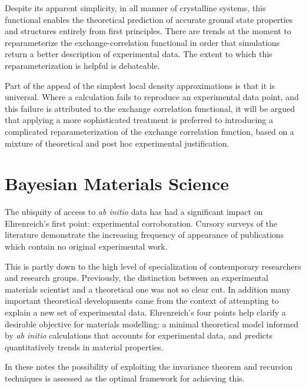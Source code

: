 Despite its apparent simplicity, in all manner of crystalline systems, 
this functional enables the theoretical
prediction of accurate ground state properties and structures entirely from first principles. 
There are trends at the moment to reparameterize the exchange-correlation functional
in order that simulations return a better description of experimental data. The extent
to which this reparameterization is helpful is debateable. 

Part of the appeal of the simplest local density approximations is that it is universal. 
Where a calculation fails to reproduce an experimental data point, and this failure is attributed to the
exchange correlation functional, it will be argued that applying a more sophisticated treatment
is preferred to introducing a complicated reparameterization of the exchange correlation
function, based on a mixture of theoretical and post hoc experimental justification.

\section{Bayesian Materials Science}
The ubiquity of access to {\it ab initio} data has had a significant impact on 
Ehrenreich's first point: experimental corroboration. 
Cursory surveys of the literature demonstrate the increasing frequency of 
appearance of publications which contain no original experimental work. 

This is partly down to the high level of specialization of contemporary 
researchers and research groups. Previously, the distinction between
an experimental materials scientist and a theoretical one was not so clear cut. 
In addition many important theoretical developments came 
from the context of attempting to explain a new set of experimental data.
Ehrenreich's four points help clarify a desirable objective for materials modelling:
a minimal theoretical model informed by {\it ab initio} calculations that accounts for 
experimental data, and {\emph predicts} quantitatively trends in material properties. 

In these notes the possibility of exploiting the invariance theorem 
and recursion techniques is assessed as the optimal framework
for achieving this. 

